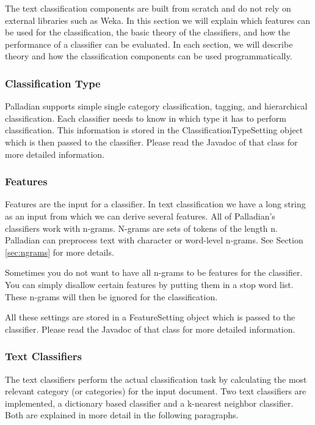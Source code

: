 \documentclass[a4paper,twoside]{book}      %
\begin{document}
The text classification components are built from scratch and do not rely on external libraries such as Weka. In this section we will explain which features can be used for the classification, the basic theory of the classifiers, and how the performance of a classifier can be evaluated. In each section, we will describe theory and how the classification components can be used programmatically.

\subsubsection{Classification Type}
Palladian supports simple single category classification, tagging, and hierarchical classification. Each classifier needs to know in which type it has to perform classification.
This information is stored in the ClassificationTypeSetting object which is then passed to the classifier. Please read the Javadoc of that class for more detailed information.

\subsubsection{Features}
Features are the input for a classifier. In text classification we have a long string as an input from which we can derive several features. All of Palladian's classifiers work with n-grams. N-grams are sets of tokens of the length n. Palladian can preprocess text with character or word-level n-grams. See Section \ref{sec:ngrams} for more details.

Sometimes you do not want to have all n-grams to be features for the classifier. You can simply disallow certain features by putting them in a stop word list. These n-grams will then be ignored for the classification.

All these settings are stored in a FeatureSetting object which is passed to the classifier. Please read the Javadoc of that class for more detailed information.

\subsubsection{Text Classifiers}
The text classifiers perform the actual classification task by calculating the most relevant category (or categories) for the input document. Two text classifiers are implemented, a dictionary based classifier and a k-nearest neighbor classifier. Both are explained in more detail in the following paragraphs.
\end{document}
